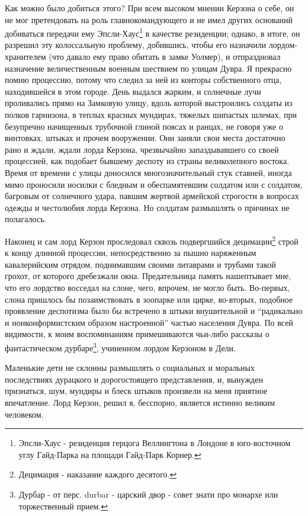 \documentclass[
  oneside,
  12pt,
  titlepage]{book}
\begin{document}
Как можно было добиться этого? При всем высоком мнении Керзона о себе, он не мог претендовать на роль главнокомандующего и не имел других оснований добиваться передачи ему Эпсли-Хаус\footnote{Эпсли-Хаус - резиденция герцога Веллингтона в Лондоне в юго-восточном углу Гайд-Парка на площади Гайд-Парк Корнер.} в качестве резиденции; однако, в итоге, он разрешил эту колоссальную проблему, добившись, чтобы его назначили лордом-хранителем (что давало ему право обитать в замке Уолмер), и отпраздновал назначение величественным военным шествием по улицам Дувра. Я прекрасно помню процессию, потому что следил за ней из конторы собственного отца, находившейся в этом городе. День выдался жарким, и солнечные лучи проливались прямо на Замковую улицу, вдоль которой выстроились солдаты из полков гарнизона, в теплых красных мундирах, тяжелых шипастых шлемах, при безупречно начищенных трубочной глиной поясах и ранцах, не говоря уже о винтовках, штыках и прочем вооружении. Они заняли свои места достаточно рано и ждали, ждали лорда Керзона, чрезвычайно запаздывавшего со своей процессией, как подобает бывшему деспоту из страны великолепного востока. Время от времени с улицы доносился многозначительный стук ставней, иногда мимо проносили носилки с бледным и обеспамятевшим солдатом или с солдатом, багровым от солнечного удара, павшим жертвой армейской строгости в вопросах одежды и честолюбия лорда Керзона. Но солдатам размышлять о причинах не полагалось.

Наконец и сам лорд Керзон проследовал сквозь подвергшийся децимации\footnote{Децимация - наказание каждого десятого.} строй к концу длинной процессии, непосредственно за пышно наряженным кавалерийским отрядом, поднимавшим своими литаврами и трубами такой грохот, от которого дребезжали окна. Предательница память нашептывает мне, что его лордство восседал на слоне, чего, впрочем, не могло быть. Во-первых, слона пришлось бы позаимствовать в зоопарке или цирке, во-вторых, подобное проявление деспотизма было бы встречено в штыки внушительной и ``радикально и нонконформистским образом настроенной'' частью населения Дувра. По всей видимости, к моим воспоминаниям примешиваются чьи-либо рассказы о фантастическом дурбаре\footnote{Дурбар - от перс. durbar - царский двор - совет знати про монархе или торжественный прием.}, учиненном лордом Керзоном в Дели.

Маленькие дети не склонны размышлять о социальных и моральных последствиях дурацкого и дорогостоящего представления, и, вынужден признаться, шум, мундиры и блеск штыков произвели на меня приятное впечатление. Лорд Керзон, решил я, бесспорно, является истинно великим человеком.
\end{document}
